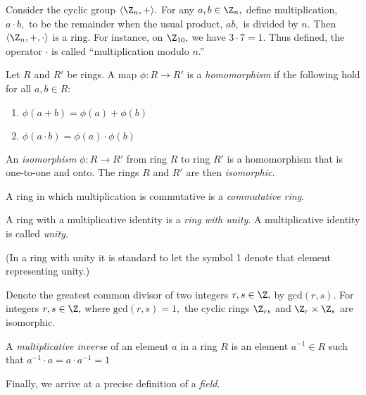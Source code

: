 \begin{example}
Consider the cyclic group $\langle \Z_n, + \rangle.$  For any
$a, b \in \Z_n,$ define multiplication, $a \cdot b,$ to be the 
remainder when the usual product, $ab,$ is divided by $n.$  Then 
$\langle \Z_n, +, \cdot \rangle$ is a ring.  For instance,
on $\Z_{10},$ we have $3\cdot 7 = 1.$
Thus defined, the operator $\cdot$ is called ``multiplication modulo
$n$.'' 
\end{example}

\begin{definition}
Let $R$ and $R'$ be rings.  A map $\phi:R\to R'$ is a
\emph{homomorphism} if the following hold for all $a,b \in R$:
\begin{enumerate}
\item $\phi(a + b) = \phi(a) + \phi(b) $
\item $\phi(a \cdot b) = \phi(a) \cdot \phi(b) $
\end{enumerate}
\end{definition}

\begin{definition}
\label{def:isomorphism}
An \emph{isomorphism} $\phi: R \to R'$ from ring $R$ to ring
$R'$ is a homomorphism that is one-to-one and onto.  The rings $R$ and
$R'$ are then \emph{isomorphic}.
\end{definition}

\begin{definition}
A ring in which multiplication is commutative is a \emph{commutative
ring}.  
\end{definition}
\begin{definition}
A ring with a multiplicative identity is a \emph{ring with
unity}. A multiplicative identity is called \emph{unity}. 
\end{definition}
(In a ring with unity it is standard to let the symbol 1 denote that
element representing unity.)
\begin{example}
\label{ex:isomorph}
Denote the greatest common divisor of two integers $r, s \in
\Z,$  by $\mbox{gcd}(r,s)$. For integers $r, s \in
\Z,$ where  $\mbox{gcd}(r,s) = 1,$ the cyclic rings
$\Z_{rs}$ and  $ \Z_r \times \Z_s $
are isomorphic.
\end{example}
\begin{definition}
A \emph{multiplicative inverse} of an element $a$ in a ring $R$ is an
element $a^{-1} \in R$ such that $a^{-1} \cdot a = a \cdot a^{-1} = 1$ 
\end{definition}
Finally, we arrive at a precise definition of a
\emph{field}.

